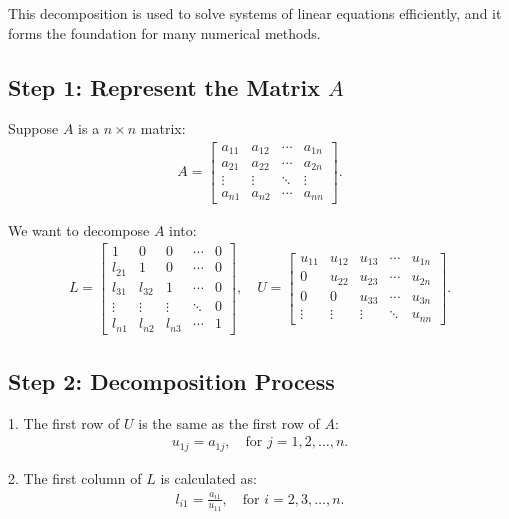 \documentclass[journal,12pt,onecolumn]{IEEEtran}
\theoremstyle{remark}
\begin{document}
This decomposition is used to solve systems of linear equations efficiently, and it forms the foundation for many numerical methods.

\subsection*{Step 1: Represent the Matrix $A$}

Suppose $A$ is a $n \times n $ matrix:
\begin{align}
A =
\begin{bmatrix}
a_{11} & a_{12} & \cdots & a_{1n} \\
a_{21} & a_{22} & \cdots & a_{2n} \\
\vdots & \vdots & \ddots & \vdots \\
a_{n1} & a_{n2} & \cdots & a_{nn}
\end{bmatrix}.
\end{align}

We want to decompose $A$ into:
\begin{align}
L =
\begin{bmatrix}
1 & 0 & 0 & \cdots & 0 \\
l_{21} & 1 & 0 & \cdots & 0 \\
l_{31} & l_{32} & 1 & \cdots & 0 \\
\vdots & \vdots & \vdots & \ddots & 0 \\
l_{n1} & l_{n2} & l_{n3} & \cdots & 1
\end{bmatrix}, \quad
U =
\begin{bmatrix}
u_{11} & u_{12} & u_{13} & \cdots & u_{1n} \\
0 & u_{22} & u_{23} & \cdots & u_{2n} \\
0 & 0 & u_{33} & \cdots & u_{3n} \\
\vdots & \vdots & \vdots & \ddots & u_{nn}
\end{bmatrix}.
\end{align}

\subsection*{Step 2: Decomposition Process}

1. The first row of  $U$ is the same as the first row of $A$:
   \begin{align}
   u_{1j} = a_{1j}, \quad \text{for } j = 1, 2, \dots, n.
   \end{align}

2. The first column of $L$ is calculated as:
   \begin{align}
   l_{i1} = \frac{a_{i1}}{u_{11}}, \quad \text{for } i = 2, 3, \dots, n.
   \end{align}
\end{document}
